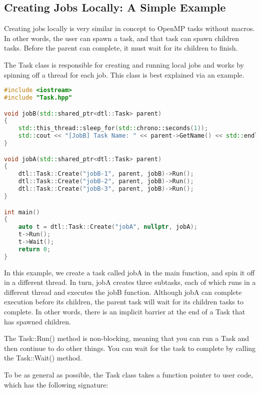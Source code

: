 \documentclass[11pt]{article}
\begin{document}
        \subsection{Creating Jobs Locally: A Simple Example}
            Creating jobs locally is very similar in concept to OpenMP tasks without macros. In other words,
            the user can spawn a task, and that task can spawn children tasks. Before the parent can complete,
            it must wait for its children to finish. 
            
            The Task class is responsible for creating and running local jobs and works by spinning off
            a thread for each job. This class is best explained via an example.
            
            \pagebreak
            \begin{lstlisting}[language=C++]
#include <iostream>
#include "Task.hpp"

void jobB(std::shared_ptr<dtl::Task> parent) 
{
    std::this_thread::sleep_for(std::chrono::seconds(1));
    std::cout << "[JobB] Task Name: " << parent->GetName() << std::endl; 
}

void jobA(std::shared_ptr<dtl::Task> parent)
{
    dtl::Task::Create("jobB-1", parent, jobB)->Run();
    dtl::Task::Create("jobB-2", parent, jobB)->Run();
    dtl::Task::Create("jobB-3", parent, jobB)->Run();
}

int main()
{
    auto t = dtl::Task::Create("jobA", nullptr, jobA);
    t->Run();
    t->Wait();
    return 0;
}
            \end{lstlisting}
                
            In this example, we create a task called jobA in the main function, and spin it off in a different
            thread. In turn, jobA creates three subtasks, each of which runs in a different thread and
            executes the jobB function. Although jobA can complete execution before its children, the parent
            task will wait for its children tasks to complete. In other words, there is an implicit barrier
            at the end of a Task that has spawned children. 
            
            The Task::Run() method is non-blocking, meaning that you can run a Task and then continue to do
            other things. You can wait for the task to complete by calling the Task::Wait() method.
            
            To be as general as possible, the Task class takes a function pointer to user code, which
            has the following signature:
                                
\end{document}
